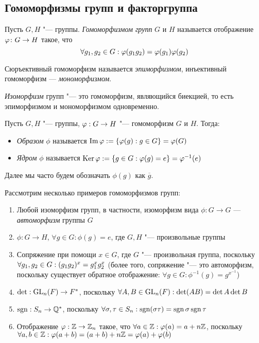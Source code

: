 \subsection{Гомоморфизмы групп и факторгруппа}

\begin{definition}
	Пусть $G, H$ "--- группы. \textit{Гомоморфизмом групп} $G$ и $H$ называется отображение $\phi \colon G \hm\to H$ такое, что
	\[
		\forall g_1, g_2 \hm\in G: \phi(g_1g_2) \hm= \phi(g_1)\phi(g_2)
	\]
\end{definition}

\begin{note}
	Сюръективный гомоморфизм называется \textit{эпиморфизмом}, инъективный гомоморфизм --- \textit{мономорфизмом}.
	
	\textit{Изоморфизм} групп "--- это гомоморфизм, являющийся биекцией, то есть эпиморфизмом и мономорфизмом одновременно.
\end{note}

\begin{definition}
	Пусть $G, H$ "--- группы, $\phi : G \hm\to H$ "--- гомоморфизм $G$ и $H$. Тогда:
	\begin{itemize}
		\item \textit{Образом} $\phi$ называется $\operatorname{Im}\varphi := \{\varphi(g): g \in G\} = \varphi(G)$
		\item \textit{Ядром} $\phi$ называется $\operatorname{Ker}\varphi := \{g \in G: \varphi(g) = e\} = \varphi^{-1}(e)$
	\end{itemize}
\end{definition}

\begin{note}
	Далее мы часто будем обозначать $\phi(g)$ как $\overline{g}$.
\end{note}

\begin{example}
	Рассмотрим несколько примеров гомоморфизмов групп:
	\begin{enumerate}
		\item Любой изоморфизм групп, в частности, изоморфизм вида $\phi: G \to G$ --- \textit{автоморфизм} группы $G$
		\item $\phi: G \to H$, $\forall g \in G: \phi(g) = e$, где $G, H$ "--- произвольные группы
		\item Сопряжение при помощи $x \in G$, где $G$ "--- произвольная группа, поскольку $\forall g_1, g_2 \hm\in G: (g_1g_2)^x = g_1^xg_2^x$ (более того, сопряжение "--- это автоморфизм, поскольку существует обратное отображение: $\forall g \in G: \phi^{-1}(g) = g^{x^{-1}}$)
		\item $\det: \operatorname{GL}_n(F) \to F^*$, поскольку $\forall A, B \in \GL_n(F): \det(AB) \hm= \det A \det B$
		\item $\operatorname{\mathop{sgn}}: S_n \to \mathbb{Q}^*$, поскольку $\forall \sigma, \tau \in S_n: \sgn(\sigma\tau) \hm= \sgn\sigma\sgn\tau$
		\item Отображение $\varphi: \mathbb{Z} \to \mathbb{Z}_n$ такое, что $\forall a \in \mathbb{Z}: \varphi(a) = a + n\mathbb{Z}$, поскольку $\forall a, b \in \Z: \phi(a + b) \hm= (a + b) + n\Z = \phi(a) + \phi(b)$
	\end{enumerate}
\end{example}

